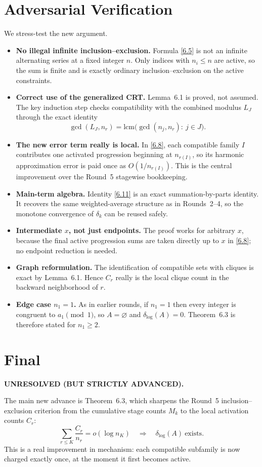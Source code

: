 \section{Adversarial Verification}
We stress-test the new argument.
\begin{itemize}
\item \textbf{No illegal infinite inclusion--exclusion.}  Formula \eqref{6.5} is not an infinite alternating series at a fixed integer $n$.  Only indices with $n_i\le n$ are active, so the sum is finite and is exactly ordinary inclusion--exclusion on the active constraints.
\item \textbf{Correct use of the generalized CRT.}  Lemma~6.1 is proved, not assumed.  The key induction step checks compatibility with the combined modulus $L_J$ through the exact identity
\[
\gcd(L_J,n_r)=\mathrm{lcm}\bigl(\gcd(n_j,n_r):\ j\in J\bigr).
\]
\item \textbf{The new error term really is local.}  In \eqref{6.8}, each compatible family $I$ contributes one activated progression beginning at $n_{r(I)}$, so its harmonic approximation error is paid once as $O(1/n_{r(I)})$.  This is the central improvement over the Round~5 stagewise bookkeeping.
\item \textbf{Main-term algebra.}  Identity \eqref{6.11} is an exact summation-by-parts identity.  It recovers the same weighted-average structure as in Rounds~2--4, so the monotone convergence of $\delta_k$ can be reused safely.
\item \textbf{Intermediate $x$, not just endpoints.}  The proof works for arbitrary $x$, because the final active progression sums are taken directly up to $x$ in \eqref{6.8}; no endpoint reduction is needed.
\item \textbf{Graph reformulation.}  The identification of compatible sets with cliques is exact by Lemma~6.1.  Hence $C_r$ really is the local clique count in the backward neighborhood of $r$.
\item \textbf{Edge case $n_1=1$.}  As in earlier rounds, if $n_1=1$ then every integer is congruent to $a_1\pmod 1$, so $A=\varnothing$ and $\delta_{\log}(A)=0$.  Theorem~6.3 is therefore stated for $n_1\ge 2$.
\end{itemize}

\section{Final}
\textbf{UNRESOLVED (BUT STRICTLY ADVANCED).}

The main new advance is Theorem~6.3, which sharpens the Round~5 inclusion--exclusion criterion from the cumulative stage counts $M_k$ to the local activation counts $C_r$:
\[
\sum_{r\le K}\frac{C_r}{n_r}=o(\log n_K)
\quad\Longrightarrow\quad
\delta_{\log}(A)\ \text{exists}.
\]
This is a real improvement in mechanism: each compatible subfamily is now charged exactly once, at the moment it first becomes active.

